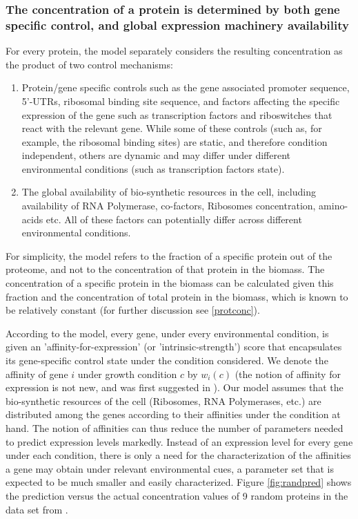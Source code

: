 \documentclass[notitlepage]{article}
\begin{document}
\subsubsection{The concentration of a protein is determined by both gene specific control, and global expression machinery availability}
For every protein, the model separately considers the resulting concentration as the product of two control mechanisms:
\begin{enumerate}
\item Protein/gene specific controls such as the gene associated promoter sequence, 5'-UTRs, ribosomal binding site sequence, and factors affecting the specific expression of the gene such as transcription factors and riboswitches that react with the relevant gene.
  While some of these controls (such as, for example, the ribosomal binding sites) are static, and therefore condition independent, others are dynamic and may differ under different environmental conditions (such as transcription factors state).
\item The global availability of bio-synthetic resources in the cell, including availability of RNA Polymerase, co-factors, Ribosomes concentration, amino-acids etc.
  All of these factors can potentially differ across different environmental conditions.
\end{enumerate}
For simplicity, the model refers to the fraction of a specific protein out of the proteome, and not to the concentration of that protein in the biomass.
The concentration of a specific protein in the biomass can be calculated given this fraction and the concentration of total protein in the biomass, which is known to be relatively constant \cite{Bremer1987,Scott2014} (for further discussion see \ref{protconc}).

According to the model, every gene, under every environmental condition, is given an 'affinity-for-expression' (or 'intrinsic-strength') score that encapsulates its gene-specific control state under the condition considered.
We denote the affinity of gene $i$ under growth condition $c$ by $w_i(c)$ (the notion of affinity for expression is not new, and was first suggested in  \cite{Maaloe1969}).
Our model assumes that the bio-synthetic resources of the cell (Ribosomes, RNA Polymerases, etc.) are distributed among the genes according to their affinities under the condition at hand.
The notion of affinities can thus reduce the number of parameters needed to predict expression levels markedly.
Instead of an expression level for every gene under each condition, there is only a need for the characterization of the affinities a gene may obtain under relevant environmental cues, a parameter set that is expected to be much smaller and easily characterized.
Figure \ref{fig:randpred} shows the prediction versus the actual concentration values of 9 random proteins in the data set from \cite{Heinemann2014}.
\end{document}

